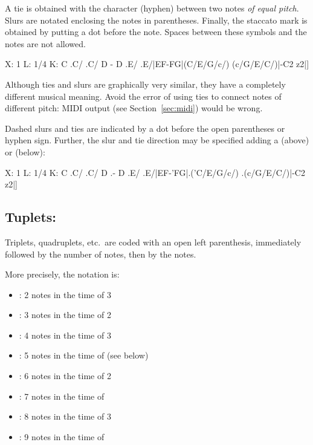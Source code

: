 \documentclass[a4paper,fullpage,12pt]{book}
\begin{document}
A tie is obtained with the character \car{-} (hyphen) between two
notes \emph{of equal pitch}. Slurs are notated enclosing the notes in
parentheses. Finally, the staccato mark is obtained by putting a dot
before the note. Spaces between these symbols and the notes are not
allowed.

\begin{abcsource}
X: 1
L: 1/4
K: C
.C/ .C/ D - D .E/ .E/|EF-FG|(C/E/G/c/) (c/G/E/C/)|-C2 z2|]
\end{abcsource}


\begin{note}

  Although ties and slurs are graphically very similar, they have a
  completely different musical meaning. Avoid the error of using ties
  to connect notes of different pitch: MIDI output (see
  Section~\ref{sec:midi}) would be wrong.

\end{note}

Dashed slurs and ties are indicated by a dot before the open
parentheses or hyphen sign. Further, the slur and tie direction may be
specified adding a  (above) or \car{,} (below):

\begin{abcsource}
X: 1
L: 1/4
K: C
.C/ .C/ D .- D .E/ .E/|EF-'FG|.('C/E/G/c/) .(c/G/E/C/)|-C2 z2|]
\end{abcsource}



\subsection{Tuplets: }

Triplets, quadruplets, etc.\ are coded with an open left parenthesis,
immediately followed by the number of notes, then by the notes.

More precisely, the notation is:

\begin{itemize}
  \item {}: 2 notes in the time of 3
  \item {}: 3 notes in the time of 2
  \item {}: 4 notes in the time of 3
  \item {}: 5 notes in the time of  (see below)
  \item {}: 6 notes in the time of 2
  \item {}: 7 notes in the time of 
  \item {}: 8 notes in the time of 3
  \item {}: 9 notes in the time of 
\end{itemize}
\end{document}
